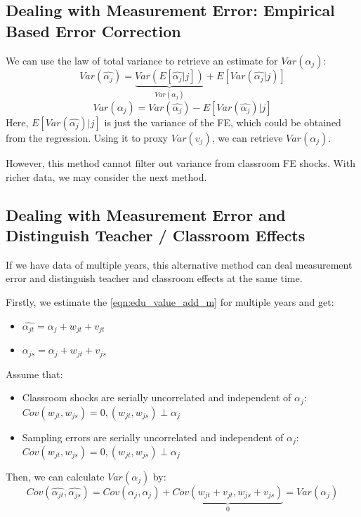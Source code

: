     \subsection{Dealing with Measurement Error: Empirical Based Error Correction}

        We can use the law of total variance to retrieve an estimate for $Var(\alpha_j)$:
        $$Var(\widehat{\alpha_j})=\underbrace{Var(E[\widehat{\alpha_j}|j])}_{Var(\alpha_j)}+E[Var(\widehat{\alpha_j}|j)]$$
        $$Var(\alpha_j)=Var(\widehat{\alpha_j})-E[Var(\widehat{\alpha_j})|j]$$
        Here, $E[Var(\widehat{\alpha_j})|j]$ is just the variance of the FE, which could be obtained from the regression. Using it to proxy $Var(v_j)$, we can retrieve $Var(\alpha_j)$.
        
        However, this method cannot filter out variance from classroom FE shocks. With richer data, we may consider the next method.
        
    \subsection{Dealing with Measurement Error and Distinguish Teacher / Classroom Effects}

        If we have data of multiple years, this alternative method can deal measurement error and distinguish teacher and classroom effects at the same time.

        Firstly, we estimate the \ref{eqn:edu_value_add_m} for multiple years and get:
        \begin{itemize}
            \item $\widehat{\alpha_{jt}}=\alpha_j + w_{jt} + v_{jt}$
            \item $\widehat{\alpha_{js}}=\alpha_j + w_{jt} + v_{js}$
        \end{itemize}
        Assume that:
        \begin{itemize}
            \item Classroom shocks are serially uncorrelated and independent of $\alpha_j$: $Cov(w_{jt},w_{js})=0, (w_{jt},w_{js})\perp \alpha_j$
            \item Sampling errors are serially uncorrelated and independent of $\alpha_j$: $Cov(w_{jt},w_{js})=0, (w_{jt},w_{js})\perp \alpha_j$
        \end{itemize}
        Then, we can calculate $Var(\alpha_j)$ by:
        $$Cov(\widehat{\alpha_{jt}},\widehat{\alpha_{js}}) = Cov(\alpha_j,\alpha_j) + \underbrace{Cov(w_{jt}+v_{jt},w_{js}+v_{js})}_{0} = Var(\alpha_j)$$

